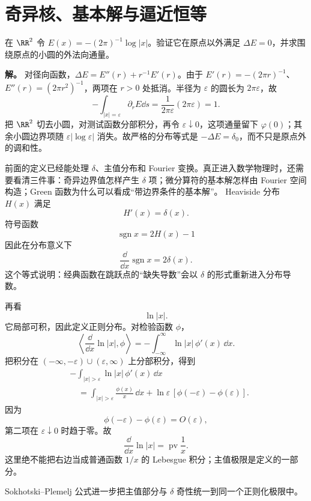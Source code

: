 \section{奇异核、基本解与逼近恒等}

\begin{workedexample}
在 \(\RR^2\) 令 \(E(x)=-(2\pi)^{-1}\log|x|\)。验证它在原点以外满足 \(\Delta E=0\)，并求围绕原点的小圆的外法向通量。

\textbf{解。} 对径向函数，\(\Delta E=E''(r)+r^{-1}E'(r)\)。由于 \(E'(r)=-(2\pi r)^{-1}\)、\(E''(r)=(2\pi r^2)^{-1}\)，两项在 \(r>0\) 处抵消。半径为 \(\varepsilon\) 的圆长为 \(2\pi\varepsilon\)，故
\[
-\int_{|x|=\varepsilon}\partial_rE\dd s
=\frac1{2\pi\varepsilon}(2\pi\varepsilon)=1.
\]
把 \(\RR^2\) 切去小圆，对测试函数分部积分，再令 \(\varepsilon\downarrow0\)，这项通量留下 \(\varphi(0)\)；其余小圆边界项随 \(\varepsilon|\log\varepsilon|\) 消失。故严格的分布等式是 \(-\Delta E=\delta_0\)，而不只是原点外的调和性。
\end{workedexample}


前面的定义已经能处理 $\delta$、主值分布和 Fourier 变换。真正进入数学物理时，还需要看清三件事：奇异边界值怎样产生 $\delta$ 项；微分算符的基本解怎样由 Fourier 空间构造；Green 函数为什么可以看成“带边界条件的基本解”。
Heaviside 分布 $H(x)$ 满足
\[
H'(x)=\delta(x).
\]
符号函数
\[
\operatorname{sgn}x=2H(x)-1
\]
因此在分布意义下
\[
{
\frac{\dd}{\dd x}\operatorname{sgn}x=2\delta(x)
}.
\]
这个等式说明：经典函数在跳跃点的“缺失导数”会以 $\delta$ 的形式重新进入分布导数。

再看
\[
\ln|x|.
\]
它局部可积，因此定义正则分布。对检验函数 $\phi$，
\[
\left\langle \frac{\dd}{\dd x}\ln|x|,\phi\right\rangle
=-\int_{-\infty}^{\infty}\ln|x|\,\phi'(x)\,\dd x.
\]
把积分在 $( -\infty,-\varepsilon)\cup(\varepsilon,\infty)$ 上分部积分，得到
\[
\begin{aligned}
&-\int_{|x|>\varepsilon}\ln|x|\,\phi'(x)\,\dd x\\
&\quad=\int_{|x|>\varepsilon}\frac{\phi(x)}{x}\,\dd x
+\ln\varepsilon\,[\phi(-\varepsilon)-\phi(\varepsilon)].
\end{aligned}
\]
因为
\[
\phi(-\varepsilon)-\phi(\varepsilon)=O(\varepsilon),
\]
第二项在 $\varepsilon\downarrow0$ 时趋于零。故
\begin{equation*}{
\frac{\dd}{\dd x}\ln|x|
=\operatorname{pv}\frac1x
}.\end{equation*}
这里绝不能把右边当成普通函数 $1/x$ 的 Lebesgue 积分；主值极限是定义的一部分。

Sokhotski--Plemelj 公式进一步把主值部分与 $\delta$ 奇性统一到同一个正则化极限中。

